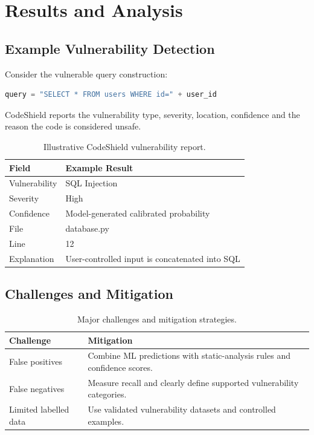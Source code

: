 \documentclass[12pt,a4paper]{report}
\begin{document}
\chapter{Results and Analysis}

\section{Example Vulnerability Detection}
Consider the vulnerable query construction:
\begin{lstlisting}[language=Python]
query = "SELECT * FROM users WHERE id=" + user_id
\end{lstlisting}
CodeShield reports the vulnerability type, severity, location, confidence and the reason the code is considered unsafe.

\begin{table}[H]
\centering
\caption{Illustrative CodeShield vulnerability report.}
\begin{tabular}{lp{8cm}}
\toprule
\textbf{Field} & \textbf{Example Result}\\
\midrule
Vulnerability & SQL Injection\\
Severity & High\\
Confidence & Model-generated calibrated probability\\
File & database.py\\
Line & 12\\
Explanation & User-controlled input is concatenated into SQL\\
\bottomrule
\end{tabular}
\end{table}

\section{Challenges and Mitigation}
\begin{table}[H]
\centering
\caption{Major challenges and mitigation strategies.}
\begin{tabular}{p{4cm}p{9.5cm}}
\toprule
\textbf{Challenge} & \textbf{Mitigation}\\
\midrule
False positives & Combine ML predictions with static-analysis rules and confidence scores.\\
False negatives & Measure recall and clearly define supported vulnerability categories.\\
Limited labelled data & Use validated vulnerability datasets and controlled examples.\\
\bottomrule
\end{tabular}
\end{table}
\end{document}
